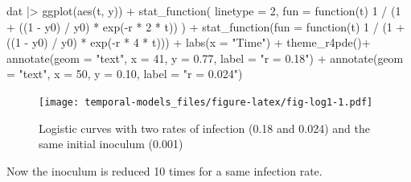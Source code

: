 \documentclass[
  letterpaper,
]{book}
\newenvironment{Shaded}{\begin{snugshade}}{\end{snugshade}}
\newcommand{\AttributeTok}[1]{\textcolor[rgb]{0.40,0.45,0.13}{#1}}
\newcommand{\ControlFlowTok}[1]{\textcolor[rgb]{0.00,0.23,0.31}{#1}}
\newcommand{\DecValTok}[1]{\textcolor[rgb]{0.68,0.00,0.00}{#1}}
\newcommand{\FloatTok}[1]{\textcolor[rgb]{0.68,0.00,0.00}{#1}}
\newcommand{\FunctionTok}[1]{\textcolor[rgb]{0.28,0.35,0.67}{#1}}
\newcommand{\NormalTok}[1]{\textcolor[rgb]{0.00,0.23,0.31}{#1}}
\newcommand{\SpecialCharTok}[1]{\textcolor[rgb]{0.37,0.37,0.37}{#1}}
\newcommand{\StringTok}[1]{\textcolor[rgb]{0.13,0.47,0.30}{#1}}
\begin{document}
\begin{Shaded}
\begin{Highlighting}[]
\NormalTok{dat }\SpecialCharTok{|\textgreater{}}
  \FunctionTok{ggplot}\NormalTok{(}\FunctionTok{aes}\NormalTok{(t, y)) }\SpecialCharTok{+}
  \FunctionTok{stat\_function}\NormalTok{(}
    \AttributeTok{linetype =} \DecValTok{2}\NormalTok{,}
    \AttributeTok{fun =} \ControlFlowTok{function}\NormalTok{(t) }\DecValTok{1} \SpecialCharTok{/}\NormalTok{ (}\DecValTok{1} \SpecialCharTok{+}\NormalTok{ ((}\DecValTok{1} \SpecialCharTok{{-}}\NormalTok{ y0) }\SpecialCharTok{/}\NormalTok{ y0) }\SpecialCharTok{*} \FunctionTok{exp}\NormalTok{(}\SpecialCharTok{{-}}\NormalTok{r }\SpecialCharTok{*} \DecValTok{2} \SpecialCharTok{*}\NormalTok{ t))}
\NormalTok{  ) }\SpecialCharTok{+}
  \FunctionTok{stat\_function}\NormalTok{(}\AttributeTok{fun =} \ControlFlowTok{function}\NormalTok{(t) }\DecValTok{1} \SpecialCharTok{/}\NormalTok{ (}\DecValTok{1} \SpecialCharTok{+}\NormalTok{ ((}\DecValTok{1} \SpecialCharTok{{-}}\NormalTok{ y0) }\SpecialCharTok{/}\NormalTok{ y0) }\SpecialCharTok{*} \FunctionTok{exp}\NormalTok{(}\SpecialCharTok{{-}}\NormalTok{r }\SpecialCharTok{*} \DecValTok{4} \SpecialCharTok{*}\NormalTok{ t))) }\SpecialCharTok{+}
  \FunctionTok{labs}\NormalTok{(}\AttributeTok{x =} \StringTok{"Time"}\NormalTok{) }\SpecialCharTok{+}
\FunctionTok{theme\_r4pde}\NormalTok{()}\SpecialCharTok{+}
  \FunctionTok{annotate}\NormalTok{(}\AttributeTok{geom =} \StringTok{"text"}\NormalTok{, }\AttributeTok{x =} \DecValTok{41}\NormalTok{, }\AttributeTok{y =} \FloatTok{0.77}\NormalTok{, }\AttributeTok{label =} \StringTok{"r = 0.18"}\NormalTok{) }\SpecialCharTok{+}
  \FunctionTok{annotate}\NormalTok{(}\AttributeTok{geom =} \StringTok{"text"}\NormalTok{, }\AttributeTok{x =} \DecValTok{50}\NormalTok{, }\AttributeTok{y =} \FloatTok{0.10}\NormalTok{, }\AttributeTok{label =} \StringTok{"r = 0.024"}\NormalTok{)}
\end{Highlighting}
\end{Shaded}

\begin{figure}

\texttt{[image: temporal-models\_files/figure-latex/fig-log1-1.pdf]} \hfill{}

\caption{\label{fig-log1}Logistic curves with two rates of infection
(0.18 and 0.024) and the same initial inoculum (0.001)}

\end{figure}

Now the inoculum is reduced 10 times for a same infection rate.
\end{document}
